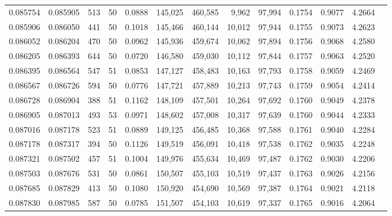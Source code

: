 \begin{tabular}{rrrrrrrrrrrrr}
0.085754 & 0.085905 &   513 &  50 &                                     0.0888 & 145,025 & 460,585 &   9,962 &  97,994 & 0.1754 & 0.9077 & 4.2664 \\
0.085906 & 0.086050 &   441 &  50 &                                     0.1018 & 145,466 & 460,144 &  10,012 &  97,944 & 0.1755 & 0.9073 & 4.2623 \\
0.086052 & 0.086204 &   470 &  50 &                                     0.0962 & 145,936 & 459,674 &  10,062 &  97,894 & 0.1756 & 0.9068 & 4.2580 \\
0.086205 & 0.086393 &   644 &  50 &                                     0.0720 & 146,580 & 459,030 &  10,112 &  97,844 & 0.1757 & 0.9063 & 4.2520 \\
0.086395 & 0.086564 &   547 &  51 &                                     0.0853 & 147,127 & 458,483 &  10,163 &  97,793 & 0.1758 & 0.9059 & 4.2469 \\
0.086567 & 0.086726 &   594 &  50 &                                     0.0776 & 147,721 & 457,889 &  10,213 &  97,743 & 0.1759 & 0.9054 & 4.2414 \\
0.086728 & 0.086904 &   388 &  51 &                                     0.1162 & 148,109 & 457,501 &  10,264 &  97,692 & 0.1760 & 0.9049 & 4.2378 \\
0.086905 & 0.087013 &   493 &  53 &                                     0.0971 & 148,602 & 457,008 &  10,317 &  97,639 & 0.1760 & 0.9044 & 4.2333 \\
0.087016 & 0.087178 &   523 &  51 &                                     0.0889 & 149,125 & 456,485 &  10,368 &  97,588 & 0.1761 & 0.9040 & 4.2284 \\
0.087178 & 0.087317 &   394 &  50 &                                     0.1126 & 149,519 & 456,091 &  10,418 &  97,538 & 0.1762 & 0.9035 & 4.2248 \\
0.087321 & 0.087502 &   457 &  51 &                                     0.1004 & 149,976 & 455,634 &  10,469 &  97,487 & 0.1762 & 0.9030 & 4.2206 \\
0.087503 & 0.087676 &   531 &  50 &                                     0.0861 & 150,507 & 455,103 &  10,519 &  97,437 & 0.1763 & 0.9026 & 4.2156 \\
0.087685 & 0.087829 &   413 &  50 &                                     0.1080 & 150,920 & 454,690 &  10,569 &  97,387 & 0.1764 & 0.9021 & 4.2118 \\
0.087830 & 0.087985 &   587 &  50 &                                     0.0785 & 151,507 & 454,103 &  10,619 &  97,337 & 0.1765 & 0.9016 & 4.2064 \\

\end{tabular}
